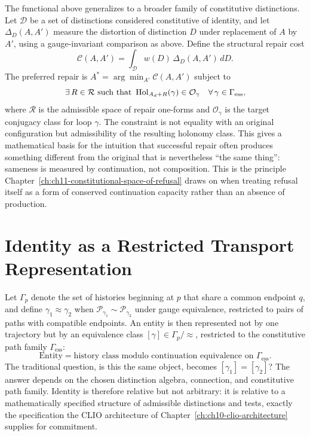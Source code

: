The functional above generalizes to a broader family of constitutive distinctions. Let $\mathcal{D}$ be a set of distinctions considered constitutive of identity, and let $\Delta_D(A,A')$ measure the distortion of distinction $D$ under replacement of $A$ by $A'$, using a gauge-invariant comparison as above. Define the structural repair cost
\[
\mathcal{C}(A,A') = \int_{\mathcal{D}} w(D)\, \Delta_D(A,A')\, dD.
\]
The preferred repair is $A^\ast = \arg\min_{A'} \mathcal{C}(A,A')$ subject to
\[
\exists\, R \in \mathcal{R} \text{ such that } \operatorname{Hol}_{A_d+R}(\gamma) \in \mathcal{O}_\gamma \quad \forall\, \gamma \in \Gamma_{\mathrm{ess}},
\]
where $\mathcal{R}$ is the admissible space of repair one-forms and $\mathcal{O}_\gamma$ is the target conjugacy class for loop $\gamma$. The constraint is not equality with an original configuration but admissibility of the resulting holonomy class. This gives a mathematical basis for the intuition that successful repair often produces something different from the original that is nevertheless ``the same thing'': sameness is measured by continuation, not composition. This is the principle Chapter~\ref{ch:ch11-constitutional-space-of-refusal} draws on when treating refusal itself as a form of conserved continuation capacity rather than an absence of production.

\section{Identity as a Restricted Transport Representation}

Let $\Gamma_p$ denote the set of histories beginning at $p$ that share a common endpoint $q$, and define $\gamma_1 \approx \gamma_2$ when $\mathcal{P}_{\gamma_1} \sim \mathcal{P}_{\gamma_2}$ under gauge equivalence, restricted to pairs of paths with compatible endpoints. An entity is then represented not by one trajectory but by an equivalence class $[\gamma] \in \Gamma_p/{\approx}$, restricted to the constitutive path family $\Gamma_{\mathrm{ess}}$:
\[
\text{Entity} = \text{history class modulo continuation equivalence on } \Gamma_{\mathrm{ess}}.
\]
The traditional question, is this the same object, becomes $[\gamma_1] = [\gamma_2]$? The answer depends on the chosen distinction algebra, connection, and constitutive path family. Identity is therefore relative but not arbitrary: it is relative to a mathematically specified structure of admissible distinctions and tests, exactly the specification the CLIO architecture of Chapter~\ref{ch:ch10-clio-architecture} supplies for commitment.

